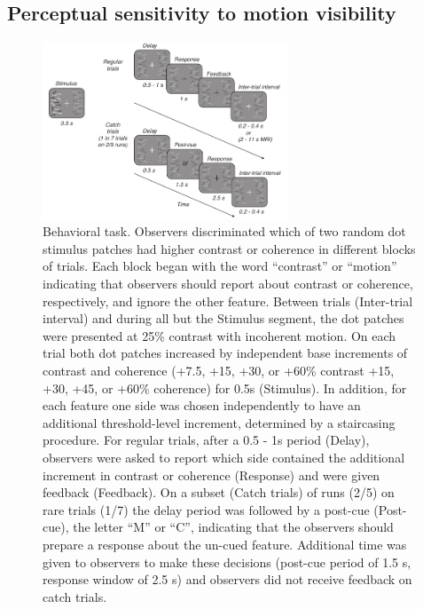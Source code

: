 \subsection{Perceptual sensitivity to motion visibility}


\begin{figure}
\centering
\includegraphics[keepaspectratio,width=0.65\textwidth]{figs_c3/Fig1_behav.pdf}
\caption[Behavioral task]{Behavioral task. Observers discriminated which of two random dot stimulus patches had higher contrast or coherence in different blocks of trials. Each block began with the word “contrast” or “motion” indicating that observers should report about contrast or coherence, respectively, and ignore the other feature. Between trials (Inter-trial interval) and during all but the Stimulus segment, the dot patches were presented at 25\% contrast with incoherent motion. On each trial both dot patches increased by independent base increments of contrast and coherence (+7.5, +15, +30, or +60\% contrast +15, +30, +45, or +60\% coherence) for 0.5s (Stimulus). In addition, for each feature one side was chosen independently to have an additional threshold-level increment, determined by a staircasing procedure. For regular trials, after a 0.5 - 1s period (Delay), observers were asked to report which side contained the additional increment in contrast or coherence (Response) and were given feedback (Feedback). On a subset (Catch trials) of runs (2/5) on rare trials (1/7) the delay period was followed by a post-cue (Post-cue), the letter “M” or “C”, indicating that the observers should prepare a response about the un-cued feature. Additional time was given to observers to make these decisions (post-cue period of 1.5 s, response window of 2.5 s) and observers did not receive feedback on catch trials.}
\label{fig:c3f1}
\end{figure}

